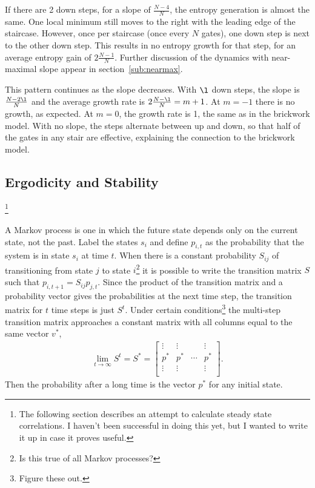 If there are 2 down steps, for a slope of $\frac{N-4}{N}$, the entropy generation is almost the same. One local minimum still moves to the right with the leading edge of the staircase. However, once per staircase (once every $N$ gates), one down step is next to the other down step. This results in no entropy growth for that step, for an average entropy gain of $2\frac{N-1}{N}$. Further discussion of the dynamics with near-maximal slope appear in section~\ref{sub:nearmax}.

This pattern continues as the slope decreases. With $\l$ down steps, the slope is $\frac{N-2\l}{N}$ and the average growth rate is $2\frac{N-\l}{N} = m+1$. At $m = -1$ there is no growth, as expected. At $m=0$, the growth rate is 1, the same as in the brickwork model. With no slope, the steps alternate between up and down, so that half of the gates in any stair are effective, explaining the connection to the brickwork model.

\subsection{Ergodicity and Stability}\footnote{The following section describes an attempt to calculate steady state correlations. I haven't been successful in doing this yet, but I wanted to write it up in case it proves useful.} \label{sub:erg}

A Markov process is one in which the future state depends only on the current state, not the past. Label the states $s_i$ and define $p_{i,t}$ as the probability that the system is in state $s_i$ at time $t$. When there is a constant probability $S_{ij}$ of transitioning from state $j$ to state $i$\footnote{Is this true of all Markov processes?} it is possible to write the transition matrix $S$ such that $p_{i,t+1}= S_{ij}p_{j,t}$. Since the product of the transition matrix and a probability vector gives the probabilities at the next time step, the transition matrix for $t$ time steps is just $S^t$. Under certain conditions\footnote{Figure these out.} the multi-step transition matrix approaches a constant matrix with all columns equal to the same vector $v^*$,
\begin{align}
\lim\limits_{t\to \infty}S^t = S^* = \begin{bmatrix}
\vdots & \vdots &  & \vdots\\
p^* & p^* & \cdots & p^*\\
\vdots & \vdots &  & \vdots\\
\end{bmatrix}.
\end{align}
Then the probability after a long time is the vector $p^*$ for any initial state.

